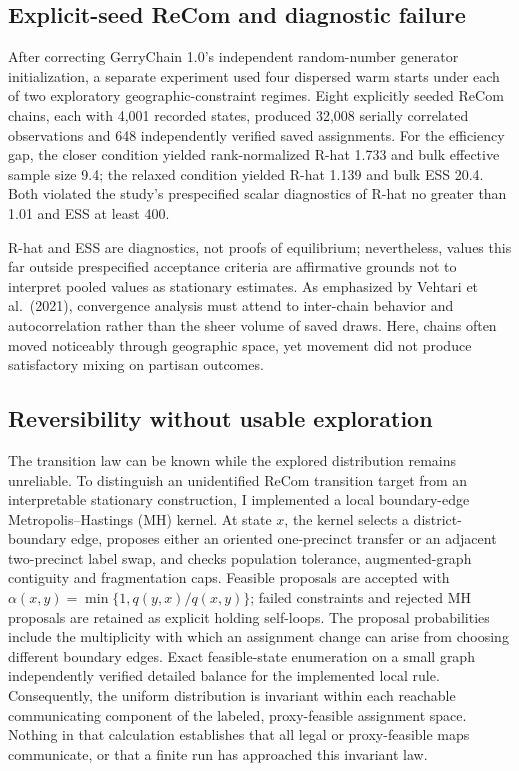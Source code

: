\documentclass[
  10pt,
]{article}
\begin{document}
\hypertarget{explicit-seed-recom-and-diagnostic-failure}{%
\subsection{Explicit-seed ReCom and diagnostic
failure}\label{explicit-seed-recom-and-diagnostic-failure}}

After correcting GerryChain 1.0's independent random-number generator
initialization, a separate experiment used four dispersed warm starts
under each of two exploratory geographic-constraint regimes. Eight
explicitly seeded ReCom chains, each with 4,001 recorded states,
produced 32,008 serially correlated observations and 648 independently
verified saved assignments. For the efficiency gap, the closer condition
yielded rank-normalized R-hat 1.733 and bulk effective sample size 9.4;
the relaxed condition yielded R-hat 1.139 and bulk ESS 20.4. Both
violated the study's prespecified scalar diagnostics of R-hat no greater
than 1.01 and ESS at least 400.

R-hat and ESS are diagnostics, not proofs of equilibrium; nevertheless,
values this far outside prespecified acceptance criteria are affirmative
grounds not to interpret pooled values as stationary estimates. As
emphasized by Vehtari et al.~(2021), convergence analysis must attend to
inter-chain behavior and autocorrelation rather than the sheer volume of
saved draws. Here, chains often moved noticeably through geographic
space, yet movement did not produce satisfactory mixing on partisan
outcomes.

\hypertarget{reversibility-without-usable-exploration}{%
\subsection{Reversibility without usable
exploration}\label{reversibility-without-usable-exploration}}

The transition law can be known while the explored distribution remains
unreliable. To distinguish an unidentified ReCom transition target from
an interpretable stationary construction, I implemented a local
boundary-edge Metropolis--Hastings (MH) kernel. At state \(x\), the
kernel selects a district-boundary edge, proposes either an oriented
one-precinct transfer or an adjacent two-precinct label swap, and checks
population tolerance, augmented-graph contiguity and fragmentation caps.
Feasible proposals are accepted with
\(\alpha(x,y)=\min\{1,q(y,x)/q(x,y)\}\); failed constraints and rejected
MH proposals are retained as explicit holding self-loops. The proposal
probabilities include the multiplicity with which an assignment change
can arise from choosing different boundary edges. Exact feasible-state
enumeration on a small graph independently verified detailed balance for
the implemented local rule. Consequently, the uniform distribution is
invariant within each reachable communicating component of the labeled,
proxy-feasible assignment space. Nothing in that calculation establishes
that all legal or proxy-feasible maps communicate, or that a finite run
has approached this invariant law.
\end{document}
